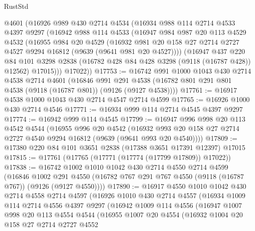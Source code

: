 \begin{lexlean}{RustStd}
\begin{coremodule}
    @4601
    (@16926
      @989
      @430
      @2714
      @4534
      (@16934
        @988
        @114
        @2714
        @4533
        @4397
        @9297
        (@16942
          @988
          @114
          @4533
          (@16947
            @984
            @987
            @20
            @113
            @4529
            @4532
            (@16955
              @984
              @20
              @4529
              (@16932
                @981
                @20
                @158
                @27
                @2714
                @2727
                @4527
                @9294
                @16812
                (@9639 (@9641 @981 @20 @4527))))
            (@16947
              @437
              @220
              @84
              @101
              @3298
              @2838
              (@16782 @428 @84 @428 @3298 (@9118 (@16787 @428)) @12562)
              @17015)))
        @17022))
@17753 := @16742
    @991
    @1000
    @1043
    @430
    @2714
    @4538
    @2714
    @4601
    (@16846
      @991
      @291
      @4538
      (@16782 @801 @291 @801 @4538 (@9118 (@16787 @801)) (@9126 (@9127 @4538))))
@17761 := @16917 @4538 @1000 @1043 @430 @2714 @4547 @2714 @4599
@17765 := @16926 @1000 @430 @2714 @4546
@17771 := @16934 @999 @114 @2714 @4545 @4397 @9297
@17774 := @16942 @999 @114 @4545
@17799 := @16947
    @996
    @998
    @20
    @113
    @4542
    @4544
    (@16955
      @996
      @20
      @4542
      (@16932 @993 @20 @158 @27 @2714 @2727 @4540 @9294 @16812 (@9639 (@9641 @993 @20 @4540))))
@17809 := @17380 @220 @84 @101 @3651 @2838 (@17388 @3651 @17391 @12397) @17015
@17815 := @17761 (@17765 (@17771 (@17774 (@17799 @17809)) @17022))
@17838 := @16742
    @1002
    @1010
    @1042
    @430
    @2714
    @4550
    @2714
    @4599
    (@16846
      @1002
      @291
      @4550
      (@16782 @767 @291 @767 @4550 (@9118 (@16787 @767)) (@9126 (@9127 @4550))))
@17890 := @16917
    @4550
    @1010
    @1042
    @430
    @2714
    @4558
    @2714
    @4597
    (@16926
      @1010
      @430
      @2714
      @4557
      (@16934
        @1009
        @114
        @2714
        @4556
        @4397
        @9297
        (@16942
          @1009
          @114
          @4556
          (@16947
            @1007
            @998
            @20
            @113
            @4554
            @4544
            (@16955
              @1007
              @20
              @4554
              (@16932
                @1004
                @20
                @158
                @27
                @2714
                @2727
                @4552

\end{coremodule}
\end{lexlean}
